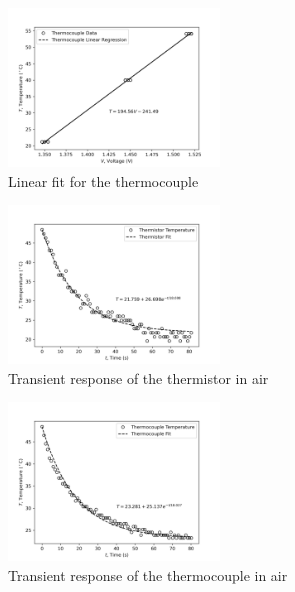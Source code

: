 \begin{figure}[h]
    \centering
    \includegraphics[width=0.5\textwidth]{matplotlib/thermocouple.png}
    \caption{Linear fit for the thermocouple}
    \label{fig:thermocouple_calibration}
\end{figure}

\begin{figure}[h]
    \centering
    \includegraphics[width=0.5\textwidth]{matplotlib/thermistor_transient_air.png}
    \caption{Transient response of the thermistor in air}
    \label{fig:thermistor_transient_air}
\end{figure}

\begin{figure}[h]
    \centering
    \includegraphics[width=0.5\textwidth]{matplotlib/thermocouple_transient_air.png}
    \caption{Transient response of the thermocouple in air}
    \label{fig:thermocouple_transient_air}
\end{figure}

